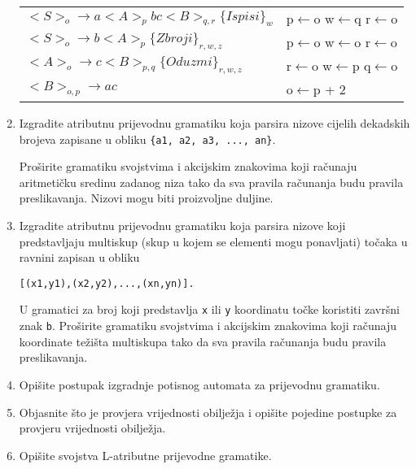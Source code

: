 \documentclass[times, 12pt, utf8]{book}
\begin{document}
\begin{enumerate}[resume]
\begin{tabular} { l l }
\( <S>_{o} \to a <A>_{p} b c <B>_{q, r} \{Ispisi\}_{w} \) & p\(\leftarrow\)o  w\(\leftarrow\)q  r\(\leftarrow\)o \\
\( <S>_{o} \to b <A>_{p} \{Zbroji\}_{r,w,z} \)  &  p\(\leftarrow\)o  w\(\leftarrow\)o  r\(\leftarrow\)o  \\
\( <A>_{o} \to c <B>_{p,q} \{Oduzmi\}_{r,w,z} \)  & r\(\leftarrow\)o  w\(\leftarrow\)p  q\(\leftarrow\)o  \\
\( <B>_{o,p} \to a c \)  &  o\(\leftarrow\)p + 2  \\
\end{tabular} 

\item
Izgradite atributnu prijevodnu gramatiku koja parsira nizove cijelih dekadskih
brojeva zapisane u obliku \verb|{|\texttt{a1, a2, a3, ..., an}\verb|}|.

Proširite gramatiku svojstvima i akcijskim znakovima koji računaju aritmetičku sredinu zadanog niza tako da sva pravila računanja budu pravila preslikavanja.
Nizovi mogu biti proizvoljne duljine. \cite[str.~178-180]{udzbenik}

\item
Izgradite atributnu prijevodnu gramatiku koja parsira nizove koji predstavljaju multiskup (skup u kojem se elementi mogu ponavljati) točaka u ravnini zapisan u obliku

\begin{alltt}
[(x1, y1), (x2, y2), ..., (xn, yn)].
\end{alltt}

U gramatici za broj koji predstavlja \texttt{x} ili \texttt{y} koordinatu točke koristiti završni znak \texttt{b}.
Proširite gramatiku svojstvima i akcijskim znakovima koji računaju koordinate težišta multiskupa tako da sva pravila računanja budu pravila preslikavanja. \cite[str.~178-180]{udzbenik}

\item
Opišite postupak izgradnje potisnog automata za prijevodnu gramatiku. \cite[str.~184-195]{udzbenik}

\item
Objasnite što je provjera vrijednosti obilježja i opišite pojedine postupke za provjeru vrijednosti obilježja. \cite[str.~200-202]{udzbenik}

\item
Opišite svojstva L-atributne prijevodne gramatike. \cite[str.~180-181]{udzbenik}


\end{enumerate}
\end{document}
